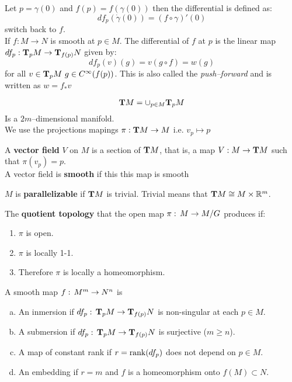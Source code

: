 \documentclass{beamer}
\begin{document}
\begin{frame}
\begin{ddef}[Differentials]
Let $p=\gamma(0)$ and $f(p)=f(\gamma(0))$ then the differential is defined as:
$$df_p(\dot\gamma(0))=(f\circ\gamma)'(0)$$
switch back to $f$.\\
If $f:M\to N$ is smooth at $p\in M$. The differential of $f$ at $p$ is the linear map $df_p:\text{\textbf{T}}_pM\to \text{\textbf{T}}_{f(p)}N$ given by:
$$df_p(v)(g)=v(g\circ f)=w(g)$$
for all $v\in \text{\textbf{T}}_pM\ g\in C^\infty(f(p))$. This is also called the \emph{push--forward} and is written as $w=f_*v$ 
\end{ddef}
\begin{ddef}
$$\text{\textbf{T}} M = \cup_{p\in M} \text{\textbf{T}}_pM$$
Is a $2m$--dimensional manifold.\\
We use the projections mapings $\pi: \text{\textbf{T}} M\to M$ i.e. $v_p \mapsto p$ 
\end{ddef}      
\end{frame}
\begin{frame}
\end{frame}
\begin{frame}
\begin{ddef}
A \textbf{vector field } $V$ on $M$ is a section of $\text{\textbf{T}} M$, that is, a map $V:M\to \text{\textbf{T}} M$ such that $\pi(v_p)=p$.\\
A vector field is \textbf{smooth} if this this map is smooth
\end{ddef}
\begin{ddef}
$M$ is \textbf{parallelizable} if $\text{\textbf{T}} M$ is trivial. Trivial means that $\text{\textbf{T}} M \cong M\times \mathbb{R}^m$. 
\end{ddef} 
\end{frame}
\begin{frame}
\begin{ddef}
The \textbf{quotient topology} that the open map $\pi:\, M\to M/G$ produces if:
\begin{enumerate}[1)]
\item $\pi$ is open.
\item $\pi$ is locally 1-1.
\item Therefore $\pi$ is locally a homeomorphism.
\end{enumerate}
\end{ddef}
\end{frame}
\begin{frame}
\begin{ddef}
A smooth map $f:\, M^m \to N^n$ is
\begin{enumerate}[a)]
\item An inmersion if $df_p:\, \text{\textbf{T}}_p M \to \text{\textbf{T}}_{f(p)} N$ is non-singular at each $p\in M$.
\item A submersion if  $df_p:\, \text{\textbf{T}}_p M \to \text{\textbf{T}}_{f(p)} N$ is surjective ($m\geq n$).
\item A map of constant rank if $r= \operatorname{rank}(df_p)$ does not depend on $p\in M$.
\item An embedding if $r=m$ and $f$ is a homeomorphism onto $f(M) \subset N$.
\end{enumerate}
\end{ddef}
\end{frame}
\end{document}
